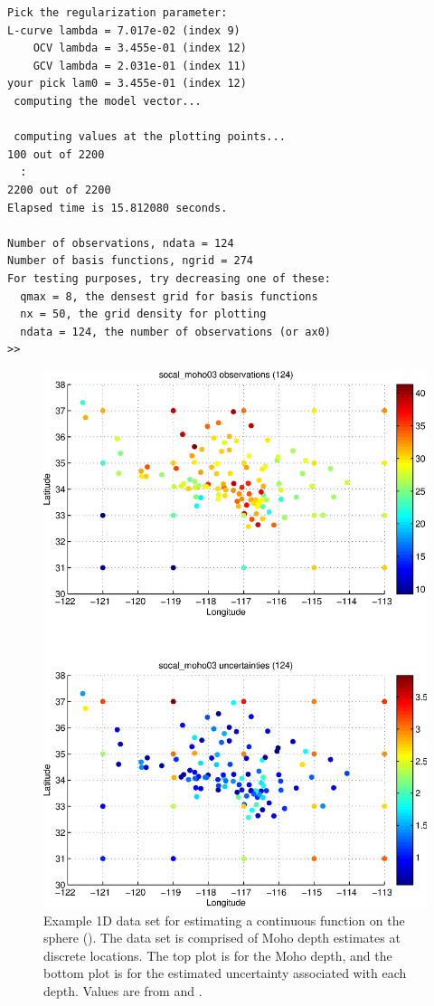 \documentclass[11pt,titlepage,fleqn]{article}
\begin{document}
\begin{spacing}{1.0}
\begin{verbatim}
Pick the regularization parameter:
L-curve lambda = 7.017e-02 (index 9)
    OCV lambda = 3.455e-01 (index 12)
    GCV lambda = 2.031e-01 (index 11)
your pick lam0 = 3.455e-01 (index 12)
 computing the model vector...
  
 computing values at the plotting points...
100 out of 2200
  :
2200 out of 2200
Elapsed time is 15.812080 seconds.
  
Number of observations, ndata = 124
Number of basis functions, ngrid = 274
For testing purposes, try decreasing one of these:
  qmax = 8, the densest grid for basis functions
  nx = 50, the grid density for plotting
  ndata = 124, the number of observations (or ax0)
>> 
\end{verbatim}
\end{spacing}


\normalsize

\clearpage\pagebreak
\begin{figure}
\includegraphics[width=16cm]{fig1D_1.eps}
\caption[]
{{
Example 1D data set for estimating a continuous function on the sphere ().
The data set is comprised of Moho depth estimates at discrete locations.
The top plot is for the Moho depth, and the bottom plot is for the estimated uncertainty associated with each depth. Values are from \citet{YanClayton2007} and \citet{Crust2}.
\label{fig:fig1D_1}
}}
\end{figure}
\end{document}
